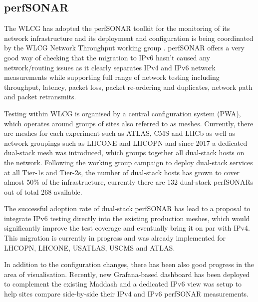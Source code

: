 \subsection{perfSONAR}
The WLCG has adopted the perfSONAR toolkit \cite{perfsonar} for the monitoring of its network infrastructure and its deployment and configuration is being coordinated by the WLCG Network Throughput working group \cite{wlcg-NTWG}.  perfSONAR offers a very good way of checking that the migration to IPv6 hasn't caused any network/routing issues as it clearly separates IPv4 and IPv6 network measurements while supporting full range of network testing including throughput, latency, packet loss, packet re-ordering and duplicates, network path and packet retransmits.

Testing within WLCG is organised by a central configuration system (PWA), which operates around groups of sites also referred to as meshes. Currently, there are meshes for each  experiment such as ATLAS, CMS and LHCb as well as network groupings such as LHCONE and LHCOPN and since 2017 a dedicated dual-stack mesh was introduced, which groups together all dual-stack hosts on the network. Following the working group campaign to deploy dual-stack services at all Tier-1s and Tier-2s, the number of dual-stack hosts has grown to cover almost 50\% of the infrastructure, currently there are 132 dual-stack perfSONARs out of total 268 available. 

The successful adoption rate of dual-stack perfSONAR has lead to a proposal %
to integrate IPv6 testing directly into the existing production meshes, which would significantly improve the test coverage and eventually bring it on par with IPv4. This migration is currently in progress and was already implemented for LHCOPN, LHCONE, USATLAS, USCMS and ATLAS. 

In addition to the configuration changes, there has been also good progress in the area of visualisation. Recently, new Grafana-based dashboard has been deployed to complement the existing Maddash \cite{psmad} and a dedicated IPv6 view was setup \cite{grafana-ipv6} to help sites compare side-by-side their IPv4 and IPv6 perfSONAR measurements. 

